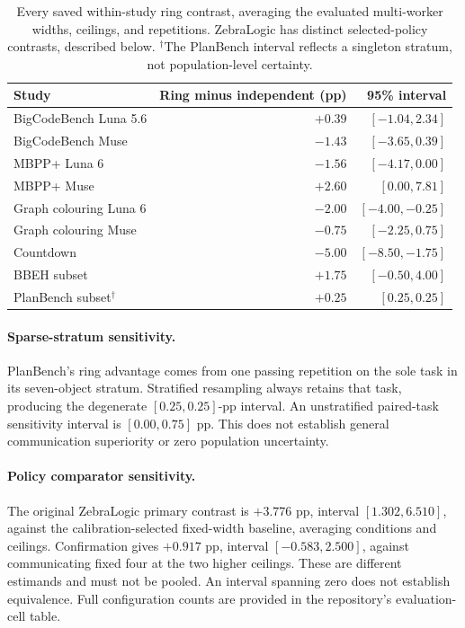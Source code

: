 \begin{table}[htbp]
\centering
\begin{tabular}{@{}lrr@{}}
\toprule
Study & Ring minus independent (pp) & 95\% interval\\
\midrule
BigCodeBench Luna 5.6 & $+0.39$ & $[-1.04,2.34]$\\
BigCodeBench Muse & $-1.43$ & $[-3.65,0.39]$\\
MBPP+ Luna 6 & $-1.56$ & $[-4.17,0.00]$\\
MBPP+ Muse & $+2.60$ & $[0.00,7.81]$\\
Graph colouring Luna 6 & $-2.00$ & $[-4.00,-0.25]$\\
Graph colouring Muse & $-0.75$ & $[-2.25,0.75]$\\
Countdown & $-5.00$ & $[-8.50,-1.75]$\\
BBEH subset & $+1.75$ & $[-0.50,4.00]$\\
PlanBench subset$^\dagger$ & $+0.25$ & $[0.25,0.25]$\\
\bottomrule
\end{tabular}
\caption{Every saved within-study ring contrast, averaging the evaluated
multi-worker widths, ceilings, and repetitions. ZebraLogic has distinct
selected-policy contrasts, described below. $^\dagger$The PlanBench interval
reflects a singleton stratum, not population-level certainty.}
\label{tab:app-communication}
\end{table}

\paragraph{Sparse-stratum sensitivity.}
PlanBench's ring advantage comes from one passing repetition on the sole
task in its seven-object stratum. Stratified resampling always retains that
task, producing the degenerate $[0.25,0.25]$-pp interval. An unstratified
paired-task sensitivity interval is $[0.00,0.75]$ pp. This does not establish
general communication superiority or zero population uncertainty.

\paragraph{Policy comparator sensitivity.}
The original ZebraLogic primary contrast is $+3.776$ pp, interval
$[1.302,6.510]$, against the calibration-selected fixed-width baseline,
averaging conditions and ceilings. Confirmation gives $+0.917$ pp, interval
$[-0.583,2.500]$, against communicating fixed four at the two higher ceilings.
These are different estimands and must not be pooled. An interval spanning
zero does not establish equivalence. Full configuration counts are provided
in the repository's evaluation-cell table.

